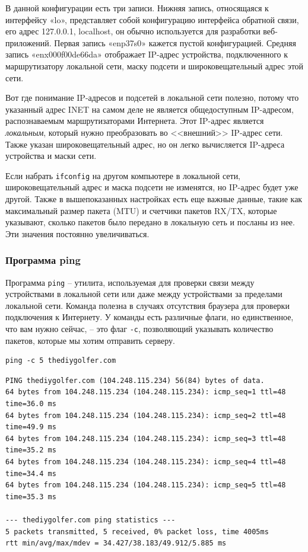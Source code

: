 \documentclass[12pt]{article}
\begin{document}
В данной конфигурации есть три записи. Нижняя запись, относящаяся к
интерфейсу «lo», представляет собой конфигурацию интерфейса обратной
связи, его адрес 127.0.0.1, localhost, он обычно используется для
разработки веб-приложений. Первая запись «enp37s0» кажется пустой
конфигурацией. Средняя запись «enx000f00de66da» отображает IP-адрес
устройства, подключенного к маршрутизатору локальной сети, маску
подсети и широковещательный адрес этой сети.

Вот где понимание IP-адресов и
подсетей в локальной сети полезно, потому что указанный адрес INET на
самом деле не является общедоступным IP-адресом, распознаваемым
маршрутизаторами Интернета. Этот IP-адрес является \emph{локальным},
который нужно преобразовать во <<внешний>> IP-адрес сети.
Также указан широковещательный адрес, но он легко
вычисляется IP-адреса устройства и маски сети.

Если набрать \texttt{ifconfig} на другом компьютере в локальной сети,
широковещательный адрес и маска подсети не изменятся, но IP-адрес будет уже
другой. Также в вышепоказанных настройках есть еще важные данные,
такие как максимальный размер пакета (MTU)
и счетчики пакетов RX/TX, которые указывают, сколько пакетов было
передано в локальную сеть и посланы из нее. Эти значения постоянно
увеличиваться.

\hypertarget{ping}{%
\subsubsection{\texorpdfstring{\protect\hyperlink{ping}{}Программа
ping}{Программа ping}}\label{ping}}

Программа \texttt{ping} -- утилита, используемая для проверки
связи между устройствами в локальной сети или даже между устройствами за
пределами локальной сети. Команда полезна в случаях отсутствия браузера
для проверки подключения к Интернету. У команды есть различные флаги, но
единственное, что вам нужно сейчас, -- это флаг \texttt{-c},
позволяющий указывать количество пакетов, которые мы хотим отправить
серверу.
\begin{verbatim}
ping -c 5 thediygolfer.com
\end{verbatim}

\begin{verbatim}
PING thediygolfer.com (104.248.115.234) 56(84) bytes of data.
64 bytes from 104.248.115.234 (104.248.115.234): icmp_seq=1 ttl=48 time=36.0 ms
64 bytes from 104.248.115.234 (104.248.115.234): icmp_seq=2 ttl=48 time=49.9 ms
64 bytes from 104.248.115.234 (104.248.115.234): icmp_seq=3 ttl=48 time=35.2 ms
64 bytes from 104.248.115.234 (104.248.115.234): icmp_seq=4 ttl=48 time=34.4 ms
64 bytes from 104.248.115.234 (104.248.115.234): icmp_seq=5 ttl=48 time=35.3 ms

--- thediygolfer.com ping statistics ---
5 packets transmitted, 5 received, 0% packet loss, time 4005ms
rtt min/avg/max/mdev = 34.427/38.183/49.912/5.885 ms
\end{verbatim}
\end{document}
